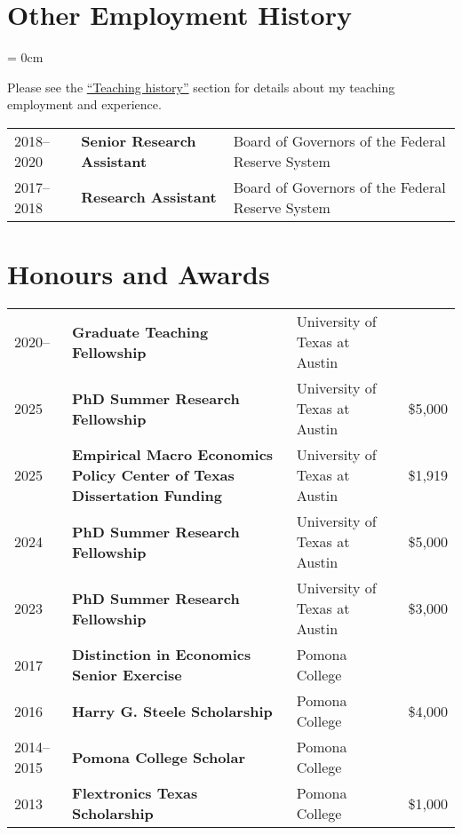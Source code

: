 \documentclass[a4paper, 10pt]{article}
\begin{document}
  \section{Other Employment History}
  \begin{compactitem}\parskip = 0cm
    \item Please see the {\hypersetup{linkcolor = black}\hyperref[sec:teaching_history]{``Teaching history''}} section for details about my teaching employment and experience.
  \end{compactitem}
  \vspace{1em}
  \begin{tabular}{lll}
    2018--2020 & \textbf{Senior Research Assistant} & Board of Governors of the Federal Reserve System\\
    2017--2018 & \textbf{Research Assistant} & Board of Governors of the Federal Reserve System
  \end{tabular}

  \section{Honours and Awards}
  \begin{tabular}{p{1.6cm} p{6.2cm} p{4.2cm} p{0.95cm}}
    2020-- & \textbf{Graduate Teaching Fellowship} & University of Texas at Austin &\\
    2025 & \textbf{PhD Summer Research Fellowship} & University of Texas at Austin & \$5,000\\
    2025 & \textbf{Empirical Macro Economics Policy \newline Center of Texas Dissertation Funding} & University of Texas at Austin & \$1,919\\
    2024 & \textbf{PhD Summer Research Fellowship} & University of Texas at Austin & \$5,000\\
    2023 & \textbf{PhD Summer Research Fellowship} & University of Texas at Austin & \$3,000\\
    2017 & \textbf{Distinction in Economics Senior Exercise} & Pomona College &\\
    2016 & \textbf{Harry G. Steele Scholarship} & Pomona College & \$4,000\\
    2014--2015 & \textbf{Pomona College Scholar} & Pomona College &\\
    2013 & \textbf{Flextronics Texas Scholarship} & Pomona College & \$1,000
  \end{tabular}
\end{document}

